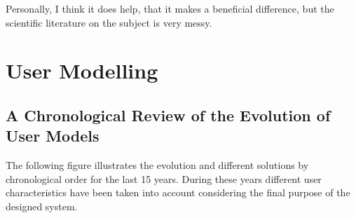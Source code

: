 

\begin{savequote}[50mm]
Personally, I think it does help, that it makes a beneficial difference, but the scientific literature on the subject is very messy.
%
\end{savequote}


\section{User Modelling}
\label{sec:user}

\ifpdf
    \graphicspath{{2_state_of_the_art/figures/PNG/}{2_state_of_the_art/figures/PDF/}{2_state_of_the_art/figures/}}
\else
    \graphicspath{{2_state_of_the_art/figures/EPS/}{2_state_of_the_art/figures/}}
\fi



\subsection{A Chronological Review of the Evolution of User Models}
\label{sec:chronological_review}

The following figure illustrates the evolution and different solutions by 
chronological order for the last 15 years. During these years different user
characteristics have been taken into account considering the final purpose of
the designed system. 

\vspace{1cm}

\setlength\taskwidth{1.7cm}

\begin{timeline}
  \label{chr:users}
\end{timeline}


